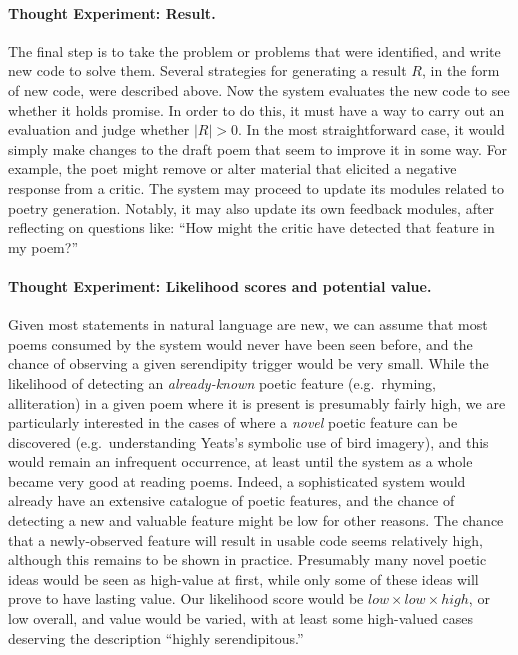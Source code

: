 


\paragraph{Thought Experiment: Result.}

The final step is to take the problem or problems that were
identified, and write new code to solve them.  Several strategies for
generating a result $R$, in the form of new code, were described
above.  Now the system evaluates the new code to see whether it holds
promise.  In order to do this, it must have a way to carry out an
evaluation and judge whether $|R|>0$.  In the most straightforward
case, it would simply make changes to the draft poem that seem to
improve it in some way.  For example, the poet might remove or alter material that
elicited a negative response from a critic.  The system may proceed to
update its modules related to poetry generation.  Notably, it may also update its own
feedback modules, after reflecting on questions like: ``How might the
critic have detected that feature in my poem?''

\paragraph{Thought Experiment: Likelihood scores and potential value.}
Given most statements in natural language are new, we can assume that
most poems consumed by the system would never have been seen before,
and the chance of observing a given serendipity trigger would be very
small.  While the likelihood of detecting an \emph{already-known}
poetic feature (e.g.~rhyming, alliteration) in a given poem where it
is present is presumably fairly high, we are particularly interested
in the cases of where a \emph{novel} poetic feature can be discovered (e.g.~understanding Yeats's symbolic use of bird imagery), and this
would remain an infrequent occurrence, at least until the system as a
whole became very good at reading poems.  Indeed, a sophisticated
system would already have an extensive catalogue of poetic features,
and the chance of detecting a new and valuable feature might be low
for other reasons.  The chance that a newly-observed feature will
result in usable code seems relatively high, although this remains to
be shown in practice.  Presumably many novel poetic ideas would be seen as
high-value at first, while only some of these ideas will prove to have
lasting value.  Our likelihood score would be
$\mathit{low}\times\mathit{low}\times\mathit{high}$, or low overall,
and value would be varied, with at least some high-valued cases
deserving the description ``highly serendipitous.''

